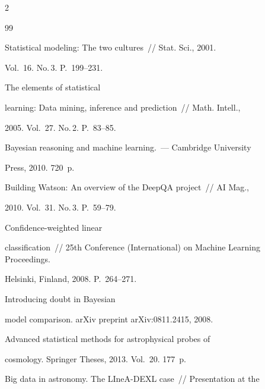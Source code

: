 \begin{multicols}{2}
{{\begin{thebibliography}{99}


 Statistical modeling: The two cultures~// Stat. Sci., 2001.


Vol.~16. No.\,3. P.~199--231.







 The elements of statistical


learning: Data mining, inference and prediction~// Math. Intell.,


2005. Vol.~27. No.\,2. P.~83--85.







 Bayesian reasoning and machine learning.~--- Cambridge University


Press, 2010.  720~p.







 Building Watson: An overview of the DeepQA project~// AI Mag.,


2010. Vol.~31. No.\,3. P.~59--79.




 Confidence-weighted linear


classification~// 25th Conference (International) on Machine Learning Proceedings.


Helsinki, Finland, 2008.  P.~264--271.




 Introducing doubt in Bayesian


model comparison. arXiv preprint arXiv:0811.2415, 2008.




 Advanced statistical methods for astrophysical probes of


cosmology. Springer Theses, 2013.  Vol.~20. 177~p.




 Big data in astronomy. The LIneA-DEXL case~// Presentation at the



\end{thebibliography}}}
\end{multicols}
